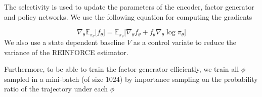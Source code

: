 The selectivity is used to update the parameters of the encoder, factor generator and policy networks.
We use the following equation for computing the gradients

$$\nabla_\theta \mathbb{E}_{\pi_\theta} \big[ f_\theta \big] =  \mathbb{E}_{\pi_\theta} \big[ \nabla_\theta f_\theta + f_\theta \nabla_\theta \log \pi_\theta \big]$$ 
We also use a state dependent baseline $V$ as a control variate to reduce the variance of the REINFORCE estimator.

Furthermore, to be able to train the factor generator efficiently, we train all $\phi$ sampled in a mini-batch (of size $1024$) by importance sampling on the probability ratio of the trajectory under each $\phi$
